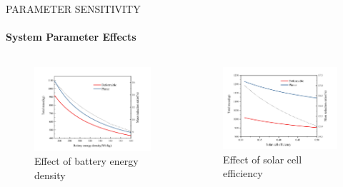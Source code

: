 \documentclass{beamer}
\begin{document}
\begin{frame}{PARAMETER SENSITIVITY}
    \framesubtitle{System Parameter Effects}
    
    \begin{columns}
        \begin{column}{0.5\textwidth}
            \begin{figure}
                \centering
                \includegraphics[width=\textwidth]{battery_sensitivity.png}
                \caption{Effect of battery energy density}
            \end{figure}
        \end{column}
        \begin{column}{0.5\textwidth}
            \begin{figure}
                \centering
                \includegraphics[width=\textwidth]{solar_sensitivity.png}
                \caption{Effect of solar cell efficiency}
            \end{figure}
        \end{column}
    \end{columns}
\end{frame}
\end{document}
